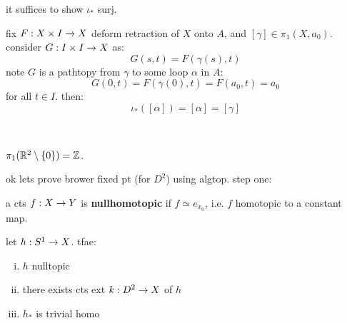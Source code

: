 \newpage
\begin{pf}[source=Primary Source Material]
    it suffices to show $\iota_{*}$ surj.

    fix $F:X\times I\rightarrow X$ deform retraction of $X$ onto $A$, and $[\gamma]\in\pi_{1}(X,a_{0})$.
    consider $G:I\times I\rightarrow X$ as:
    \begin{equation*}
        G(s,t) = F(\gamma(s),t)
    \end{equation*}
    note $G$ is a pathtopy from $\gamma$ to some loop $\alpha$ in $A$:
    \begin{equation*}
        G(0,t)=F(\gamma(0),t)=F(a_{0},t)=a_{0}
    \end{equation*}
    for all $t\in I$. then:
    \begin{equation*}
        \iota_{*}([\alpha]) = [\alpha] = [\gamma]
    \end{equation*}
\end{pf} \

\begin{crll}
    $\pi_{1}(\mathbb{R}^{2}\setminus\left\{{0}\right\}) = \mathbb{Z}$.
\end{crll}

ok lets prove brower fixed pt (for $D^{2}$) using algtop.
step one:
\begin{defn}
    a cts $f:X\rightarrow Y$ is \textbf{nullhomotopic} if $f\simeq e_{x_{0}}$,
    i.e. $f$ homotopic to a constant map.
\end{defn}

\begin{prop}
    let $h:S^{1}\rightarrow X$. tfae: \vspace{-3mm}
    \begin{enumerate}[(i)]
        \item $h$ nulltopic
        \item there exists cts ext $k:D^{2}\rightarrow X$ of $h$
        \item $h_{*}$ is trivial homo
    \end{enumerate}
\end{prop} \


